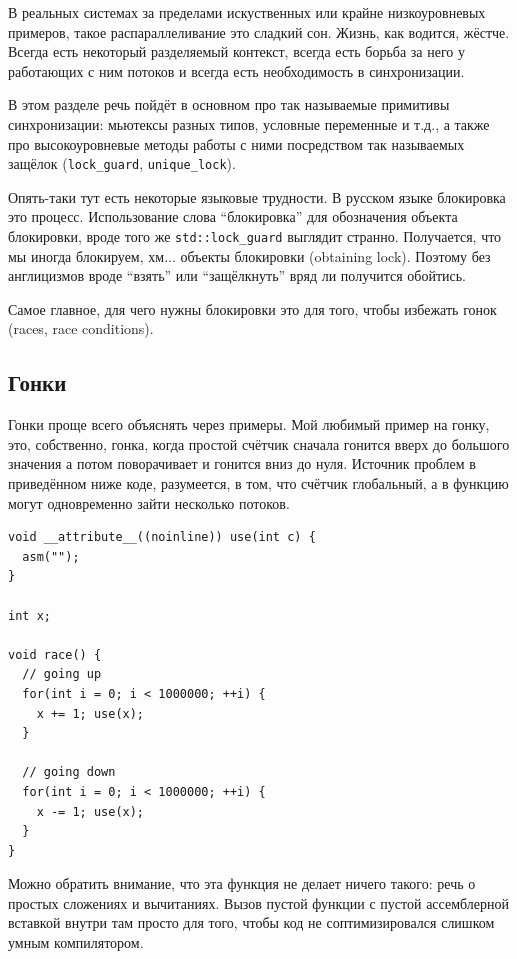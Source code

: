 \documentclass[a4paper,12pt,oneside]{book}
\begin{document}
В реальных системах за пределами искуственных или крайне низкоуровневых примеров, такое распараллеливание это сладкий сон. Жизнь, как водится, жёстче. Всегда есть некоторый разделяемый контекст, всегда есть борьба за него у работающих с ним потоков и всегда есть необходимость в синхронизации.

В этом разделе речь пойдёт в основном про так называемые примитивы синхронизации: мьютексы разных типов, условные переменные и т.д., а также про высокоуровневые методы работы с ними посредством так называемых защёлок (\lstinline!lock_guard!, \lstinline!unique_lock!).

Опять-таки тут есть некоторые языковые трудности. В русском языке блокировка это процесс. Использование слова ``блокировка'' для обозначения объекта блокировки, вроде того же \lstinline!std::lock_guard! выглядит странно. Получается, что мы иногда блокируем, хм... объекты блокировки (obtaining lock). Поэтому без англицизмов вроде ``взять'' или ``защёлкнуть'' вряд ли получится обойтись.

Самое главное, для чего нужны блокировки это для того, чтобы избежать гонок (races, race conditions).

\subsection{Гонки}\label{sub:races}

Гонки проще всего объяснять через примеры. Мой любимый пример на гонку, это, собственно, гонка, когда простой счётчик сначала гонится вверх до большого значения а потом поворачивает и гонится вниз до нуля. Источник проблем в приведённом ниже коде, разумеется, в том, что счётчик глобальный, а в функцию могут одновременно зайти несколько потоков.

\begin{lstlisting}
void __attribute__((noinline)) use(int c) {
  asm("");
}

int x;

void race() {  
  // going up
  for(int i = 0; i < 1000000; ++i) {
    x += 1; use(x);
  }

  // going down
  for(int i = 0; i < 1000000; ++i) {
    x -= 1; use(x);
  }
}
\end{lstlisting}

Можно обратить внимание, что эта функция не делает ничего такого: речь о простых сложениях и вычитаниях. Вызов пустой функции с пустой ассемблерной вставкой внутри там просто для того, чтобы код не соптимизировался слишком умным компилятором.
\end{document}
